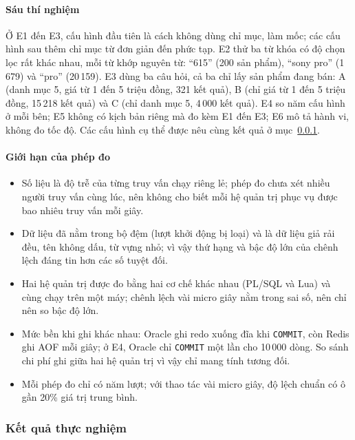 \paragraph{Sáu thí nghiệm}\label{sec:ix-experiments}

Ở E1 đến E3, cấu hình đầu tiên là cách không dùng chỉ mục, làm mốc; các cấu hình sau thêm chỉ mục từ đơn giản đến phức tạp. E2 thử ba từ khóa có độ chọn lọc rất khác nhau, mỗi từ khớp nguyên từ: ``615'' (200 sản phẩm), ``sony pro'' (1\,679) và ``pro'' (20\,159). E3 dùng ba câu hỏi, cả ba chỉ lấy sản phẩm đang bán: A (danh mục 5, giá từ 1 đến 5 triệu đồng, 321 kết quả), B (chỉ giá từ 1 đến 5 triệu đồng, 15\,218 kết quả) và C (chỉ danh mục 5, 4\,000 kết quả). E4 so năm cấu hình ở mỗi bên; E5 không có kịch bản riêng mà đo kèm E1 đến E3; E6 mô tả hành vi, không đo tốc độ. Các cấu hình cụ thể được nêu cùng kết quả ở mục~\ref{sec:ix-results}.

\paragraph{Giới hạn của phép đo}\label{sec:ix-limits}

\begin{itemize}[label=--,leftmargin=*,itemsep=2pt,topsep=4pt]
    \item Số liệu là độ trễ của từng truy vấn chạy riêng lẻ; phép đo chưa xét nhiều người truy vấn cùng lúc, nên không cho biết mỗi hệ quản trị phục vụ được bao nhiêu truy vấn mỗi giây.
    \item Dữ liệu đã nằm trong bộ đệm (lượt khởi động bị loại) và là dữ liệu giả rải đều, tên không dấu, từ vựng nhỏ; vì vậy thứ hạng và bậc độ lớn của chênh lệch đáng tin hơn các số tuyệt đối.
    \item Hai hệ quản trị được đo bằng hai cơ chế khác nhau (PL/SQL và Lua) và cùng chạy trên một máy; chênh lệch vài micro giây nằm trong sai số, nên chỉ nên so bậc độ lớn.
    \item Mức bền khi ghi khác nhau: Oracle ghi redo xuống đĩa khi \texttt{COMMIT}, còn Redis ghi AOF mỗi giây; ở E4, Oracle chỉ \texttt{COMMIT} một lần cho 10\,000 dòng. So sánh chi phí ghi giữa hai hệ quản trị vì vậy chỉ mang tính tương đối.
    \item Mỗi phép đo chỉ có năm lượt; với thao tác vài micro giây, độ lệch chuẩn có ô gần 20\% giá trị trung bình.
\end{itemize}

\subsubsection{Kết quả thực nghiệm}\label{sec:ix-results}

